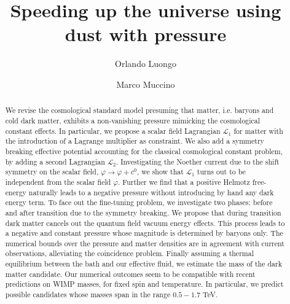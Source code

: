 \documentclass[twocolumn,showpacs, nofootinbib,aps,superscriptaddress, eqsecnum,prd,prl,notitlepage,showkeys,10pt,reprint]{revtex4-1}
\begin{document}
\title{Speeding up the universe using dust with pressure}

\author{Orlando Luongo}	

\author{Marco Muccino}


\begin{abstract}
We revise the cosmological standard model presuming that matter, i.e. baryons and cold dark matter, exhibits a non-vanishing pressure mimicking the cosmological constant effects. In particular, we propose a scalar field Lagrangian $\mathcal L_1$ for matter with the introduction of a Lagrange multiplier as constraint. We also add a symmetry breaking effective potential accounting for the classical cosmological constant problem, by adding a second Lagrangian $\mathcal{L}_2$. Investigating the Noether current due to the shift symmetry on the scalar field, $\varphi\rightarrow\varphi+c^0$, we show that $\mathcal{L}_1$ turns out to be independent from the scalar field $\varphi$. Further we find that a positive Helmotz free-energy naturally leads to a negative pressure without introducing by hand any dark energy term. To face out the fine-tuning problem, we investigate two phases: before and after transition due to the symmetry breaking. We propose that during transition dark matter cancels out the quantum field vacuum energy  effects. This process leads to a negative and constant pressure whose magnitude is determined by baryons only. The numerical bounds over the pressure and matter densities are in agreement with current observations, alleviating the coincidence problem. Finally assuming a thermal equilibrium between the bath and our effective fluid, we estimate the mass of the dark matter candidate. Our numerical outcomes seem to be compatible with recent predictions on WIMP masses, for fixed spin and temperature. In particular, we predict possible candidates whose masses span in the range $0.5-1.7$ TeV.
\end{abstract}
\end{document}
